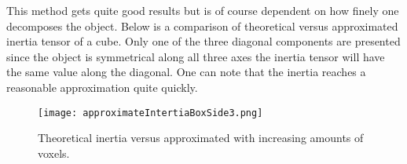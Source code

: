  This method gets quite
 good results but is of course dependent on how finely one decomposes the object.
 Below is a comparison of theoretical versus approximated inertia tensor of a cube.
 Only one of the three diagonal components are presented since the object is symmetrical
 along all three axes the inertia tensor will have the same value along the diagonal.
 One can note that the inertia reaches a reasonable approximation quite quickly.


 \begin{figure}[H]
   \centering
   \texttt{[image: approximateIntertiaBoxSide3.png]}
   \caption{Theoretical inertia versus approximated with increasing amounts of voxels.}
   \label{fig:appInertia}
 \end{figure}

%
